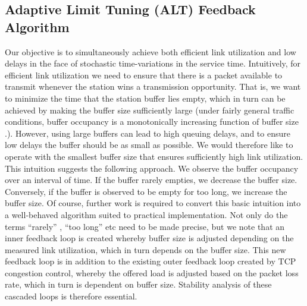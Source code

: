 \documentclass[10pt,twocolumn, journal]{IEEEtran}
\begin{document}
\subsection{Adaptive Limit Tuning (ALT) Feedback Algorithm}

Our objective is to simultaneously achieve both efficient link utilization and low delays in the face of stochastic time-variations in the service time.  Intuitively, for efficient link utilization we need to ensure that there is a packet available to transmit whenever the station wins a transmission opportunity.  That is, we want to minimize the time that the station buffer lies empty, which in turn can be achieved by making the buffer size sufficiently large (under fairly general traffic conditions, buffer occupancy is a monotonically increasing function of buffer size \cite{Kumaran_stolyer_2003}.).   However, using large buffers can lead to high queuing delays, and to ensure low delays the buffer should be as small as possible.   We would therefore like to operate with the smallest buffer size that ensures sufficiently high link utilization.  This intuition suggests the following approach. We observe the buffer occupancy over an interval of time. If the buffer rarely empties, we decrease the buffer size. Conversely, if the buffer is observed to be empty for too long, we increase the buffer size.    Of course, further work is required to convert this basic intuition into a well-behaved algorithm suited to practical implementation.   Not only do the terms ``rarely'' , ``too long'' etc need to be made precise, but we note that an inner feedback loop is created whereby buffer size is adjusted depending on the measured link utilization, which in turn depends on the buffer size.   This new feedback loop is in addition to the existing outer feedback loop created by TCP congestion control, whereby the offered load is adjusted based on the packet loss rate, which in turn is dependent on buffer size.   Stability analysis of these cascaded loops is therefore essential.
\end{document}
